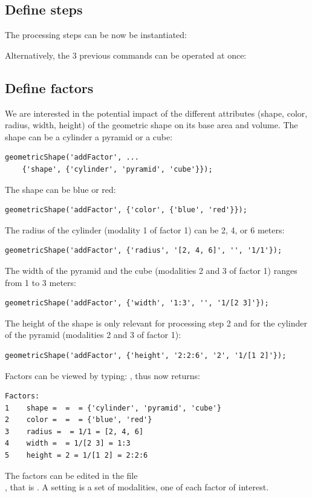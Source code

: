 \documentclass[a4paper,fleqn]{tufte-handout}
\begin{document}
\subsection{Define steps}

The processing steps can be now be instantiated:



\noindent
Alternatively, the  3 previous commands can be operated at once: \\


\subsection{Define factors}

We are interested in the potential impact of the different attributes (shape, color, radius, width, height) of the geometric shape on its base area and volume. The shape can be a cylinder a pyramid or a cube:
\begin{lstlisting}
geometricShape('addFactor', ...
	{'shape', {'cylinder', 'pyramid', 'cube'}});
\end{lstlisting}
The shape can be blue or red:
\begin{lstlisting}
geometricShape('addFactor', {'color', {'blue', 'red'}});
\end{lstlisting}
The radius of the cylinder (modality 1 of factor 1) can be 2, 4, or 6 meters:
\begin{lstlisting}
geometricShape('addFactor', {'radius', '[2, 4, 6]', '', '1/1'});
\end{lstlisting}
The width of the pyramid and the cube (modalities 2 and 3 of factor 1) ranges from 1 to 3 meters:
\begin{lstlisting}
geometricShape('addFactor', {'width', '1:3', '', '1/[2 3]'});
\end{lstlisting}
The height of the shape is only relevant for processing step 2 and for the cylinder of the pyramid (modalities 2 and 3 of factor 1):
\begin{lstlisting}
geometricShape('addFactor', {'height', '2:2:6', '2', '1/[1 2]'});
\end{lstlisting}


Factors can be viewed by typing: , thus  now returns:
\begin{lstlisting}
Factors:
1    shape =  =  = {'cylinder', 'pyramid', 'cube'}
2    color =  =  = {'blue', 'red'}
3    radius =  = 1/1 = [2, 4, 6]
4    width =  = 1/[2 3] = 1:3
5    height = 2 = 1/[1 2] = 2:2:6
\end{lstlisting}
The factors can be edited in the file \\ , that is . A setting is a set of modalities, one of each factor of interest.
\end{document}
